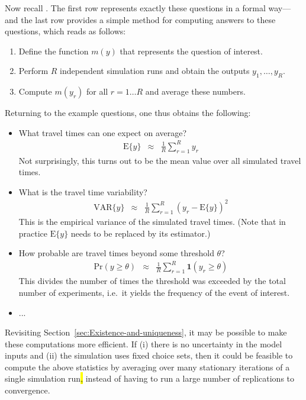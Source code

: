 Now recall . The first row 
represents exactly these questions in a formal way---and the last
row  provides a simple method for computing
answers to these questions, which reads as follows:
\begin{enumerate}
\item Define the function $m(y)$ that represents the question of interest.
\item Perform $R$ independent simulation runs and obtain the outputs $y_{1},\ldots,y_{R}$.
\item Compute $m(y_{r})$ for all $r=1\ldots R$ and average these numbers.
\end{enumerate}
Returning to the example questions, one thus obtains the following:
\begin{itemize}
\item What travel times can one expect on average?
\begin{eqnarray}
\text{E}\{y\} & \approx & \frac{1}{R}\sum_{r=1}^{R}y_{r}
\end{eqnarray}
Not surprisingly, this turns out to be the mean value over all simulated
travel times.
\item What is the travel time variability?
\begin{eqnarray}
\text{VAR}\{y\} & \approx & \frac{1}{R}\sum_{r=1}^{R}(y_{r}-\text{E}\{y\})^{2}
\end{eqnarray}
This is the empirical variance of the simulated travel times. (Note
that in practice $\text{E}\{y\}$ needs to be replaced by its estimator.)
\item How probable are travel times beyond some threshold $\theta$?
\begin{eqnarray}
\text{Pr}(y\geq\theta) & \approx & \frac{1}{R}\sum_{r=1}^{R}\mathbf{1}(y_{r}\geq\theta)
\end{eqnarray}
This divides the number of times the threshold was exceeded by the
total number of experiments, i.e.\ it yields the frequency of the event
of interest.
\item ...
\end{itemize}
Revisiting Section~\ref{sec:Existence-and-uniqueness}, it may
be possible to make these computations more efficient. If (i) there
is no uncertainty in the model inputs and (ii) the simulation uses
fixed choice sets, then it could be feasible to compute the above
statistics by averaging over many stationary iterations of a single
simulation run\hl{,} instead of having to run a large number of replications
to convergence. 

